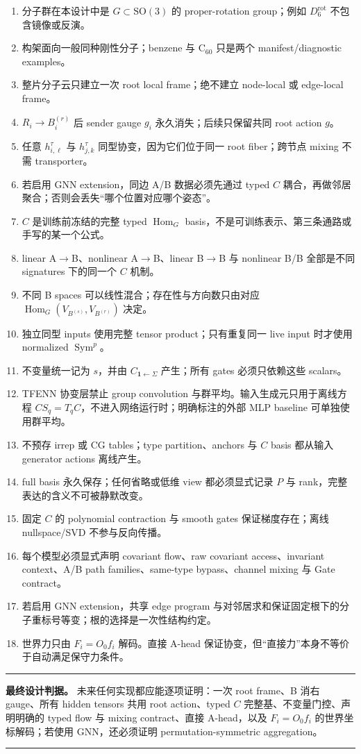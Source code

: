\documentclass[11pt,a4paper,fontset=fandol]{ctexart}
\newcommand{\SO}{\mathrm{SO}}
\newcommand{\Sym}{\operatorname{Sym}}
\newcommand{\Hom}{\operatorname{Hom}}
\newcommand{\one}{\mathbf 1}
\newenvironment{designbox}
{\par\smallskip\noindent\begin{center}\begin{minipage}{0.94\linewidth}
 \color{Ink}\hrule\vspace{.55em}\color{black}}
{\vspace{.45em}\color{Ink}\hrule\end{minipage}\end{center}\smallskip}
\begin{document}
\begin{enumerate}
  \item 分子群在本设计中是 $G\subset\SO(3)$ 的 proper-rotation group；例如 $D_6^{\mathrm{rot}}$ 不包含镜像或反演。
  \item 构架面向一般同种刚性分子；benzene 与 C$_{60}$ 只是两个 manifest/diagnostic examples。
  \item 整片分子云只建立一次 root local frame；绝不建立 node-local 或 edge-local frame。
  \item $R_i\to B_i^{(r)}$ 后 sender gauge $g_i$ 永久消失；后续只保留共同 root action $g$。
  \item 任意 $h_{i,\ell}^{\tau}$ 与 $h_{j,k}^{\tau}$ 同型协变，因为它们位于同一 root fiber；跨节点 mixing 不需 transporter。
  \item 若启用 GNN extension，同边 A/B 数据必须先通过 typed $C$ 耦合，再做邻居聚合；否则会丢失“哪个位置对应哪个姿态”。
  \item $C$ 是训练前冻结的完整 typed $\Hom_G$ basis，不是可训练表示、第三条通路或手写的某一个公式。
  \item linear A$\to$B、nonlinear A$\to$B、linear B$\to$B 与 nonlinear B/B 全部是不同 signatures 下的同一个 $C$ 机制。
  \item 不同 B spaces 可以线性混合；存在性与方向数只由对应 $\Hom_G(V_{B^{(s)}},V_{B^{(r)}})$ 决定。
  \item 独立同型 inputs 使用完整 tensor product；只有重复同一 live input 时才使用 normalized $\Sym^p$。
  \item 不变量统一记为 $s$，并由 $C_{\one\leftarrow\Sigma}$ 产生；所有 gates 必须只依赖这些 scalars。
  \item TFENN 协变层禁止 group convolution 与群平均。输入生成元只用于离线方程 $CS_q=T_qC$，不进入网络运行时；明确标注的外部 MLP baseline 可单独使用群平均。
  \item 不预存 irrep 或 CG tables；type partition、anchors 与 $C$ basis 都从输入 generator actions 离线产生。
  \item full basis 永久保存；任何省略或低维 view 都必须显式记录 $P$ 与 rank，完整表达的含义不可被静默改变。
  \item 固定 $C$ 的 polynomial contraction 与 smooth gates 保证梯度存在；离线 nullspace/SVD 不参与反向传播。
  \item 每个模型必须显式声明 covariant flow、raw covariant access、invariant context、A/B path families、same-type bypass、channel mixing 与 Gate contract。
  \item 若启用 GNN extension，共享 edge program 与对邻居求和保证固定根下的分子重标号等变；根的选择是一次性结构约定。
  \item 世界力只由 $F_i=O_0f_i$ 解码。直接 A-head 保证协变，但“直接力”本身不等价于自动满足保守力条件。
\end{enumerate}

\begin{designbox}
\textbf{最终设计判据。}
未来任何实现都应能逐项证明：一次 root frame、B 消右 gauge、所有 hidden tensors 共用 root action、typed $C$ 完整基、不变量门控、声明明确的 typed flow 与 mixing contract、直接 A-head，以及 $F_i=O_0f_i$ 的世界坐标解码；若使用 GNN，还必须证明 permutation-symmetric aggregation。
\end{designbox}
\end{document}
